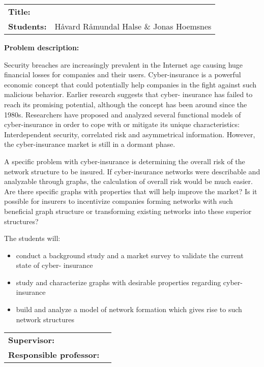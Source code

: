 \begin{titlingpage}

\noindent
\begin{tabular}{@{}p{4cm}l}
\textbf{Title:} 	& \thetitle \\
\textbf{Students:}	& Håvard Råmundal Halse \& Jonas Hoemsnes \\
\end{tabular}

\vspace{4ex}
\noindent\textbf{Problem description:}

Security breaches are increasingly prevalent in the Internet age causing huge financial losses for companies and their users. Cyber-insurance is a powerful economic concept that could potentially help companies in the fight against such malicious behavior. Earlier research suggests that cyber-
insurance has failed to reach its promising potential, although the concept has been around since the 1980s. Researchers have proposed and analyzed several functional models of cyber-insurance in order to cope with or mitigate its unique characteristics: Interdependent security, correlated risk and asymmetrical information. However, the cyber-insurance market is still in a dormant phase.

A specific problem with cyber-insurance is determining the overall risk of the network structure to be insured. If cyber-insurance networks were describable and analyzable through graphs, the calculation of overall risk would be much easier. Are there specific graphs with properties that will help improve the market? Is it possible for insurers to incentivize companies forming networks with such beneficial graph structure or transforming existing networks into these superior structures?

The students will:

\begin{itemize}
 
\item conduct a background study and a market survey to validate the current state of cyber-
insurance
\item study and characterize graphs with desirable properties regarding cyber-insurance
\item build and analyze a model of network formation which gives rise to such network structures
\end{itemize}


\vspace{2ex}

\noindent
\begin{tabular}{@{}p{4cm}l}
\textbf{Supervisor:}			& \thesupervisor \\
\textbf{Responsible professor:} 	& \theprofessor \\
\end{tabular}

\end{titlingpage}